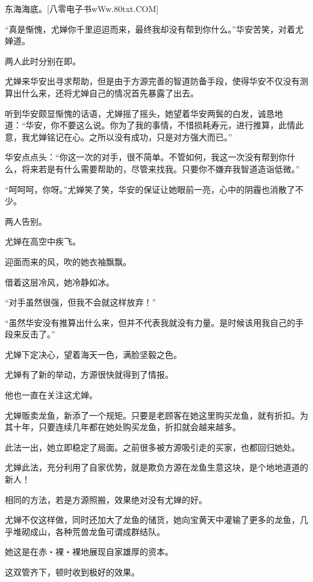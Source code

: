
\begin{this_body}

东海海底。[八零电子书wWw.80txt.COM]

“真是惭愧，尤婵你千里迢迢而来，最终我却没有帮到你什么。”华安苦笑，对着尤婵道。

两人此时分别在即。

尤婵来华安出寻求帮助，但是由于方源完善的智道防备手段，使得华安不仅没有测算出什么来，还将尤婵自己的情况首先暴露了出去。

听到华安颇显惭愧的话语，尤婵摇了摇头，她望着华安两鬓的白发，诚恳地道：“华安，你不要这么说。你为了我的事情，不惜损耗寿元，进行推算，此情此意，我尤婵铭记在心。之所以没有成功，只是对方强大而已。”

华安点点头：“你这一次的对手，很不简单。不管如何，我这一次没有帮到你什么，将来若是有什么需要帮助的，尽管来找我。只要你不嫌弃我智道造诣低微。”

“呵呵呵，你呀。”尤婵笑了笑，华安的保证让她眼前一亮，心中的阴霾也消散了不少。

两人告别。

尤婵在高空中疾飞。

迎面而来的风，吹的她衣袖飘飘。

借着这层冷风，她冷静如冰。

“对手虽然很强，但我不会就这样放弃！”

“虽然华安没有推算出什么来，但并不代表我就没有力量。是时候该用我自己的手段来反击了。”

尤婵下定决心，望着海天一色，满脸坚毅之色。

尤婵有了新的举动，方源很快就得到了情报。

他也一直在关注这尤婵。

尤婵贩卖龙鱼，新添了一个规矩。只要是老顾客在她这里购买龙鱼，就有折扣。为其十年，只要连续几年都在她处购买龙鱼，折扣就会越来越多。

此法一出，她立即稳定了局面。之前很多被方源吸引走的买家，也都回归她处。

尤婵此法，充分利用了自家优势，就是欺负方源在龙鱼生意这块，是个地地道道的新人！

相同的方法，若是方源照搬，效果绝对没有尤婵的好。

尤婵不仅这样做，同时还加大了龙鱼的储货，她向宝黄天中灌输了更多的龙鱼，几乎堆砌成山，各种荒兽龙鱼可谓成群结队。

她这是在赤・裸・裸地展现自家雄厚的资本。

这双管齐下，顿时收到极好的效果。


\end{this_body}
